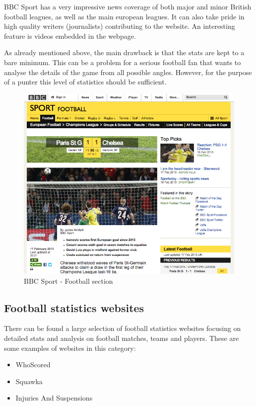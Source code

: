 BBC Sport has a very impressive news coverage of both major and minor British football leagues, as well as the main european leagues. It can also take pride in high quality writers (journalists) contributing to the website. An interesting feature is videos embedded in the webpage.

As already mentioned above, the main drawback is that the stats are kept to a bare minimum. This can be a problem for a serious football fan that wants to analyse the details of the game from all possible angles. However, for the purpose of a punter this level of statistics should be sufficient.
	
\begin{figure}[H]
	\begin{center}
		\includegraphics[width=.80\linewidth,natwidth=610,natheight=642]{req/images/bbcsport.png}
		\caption{BBC Sport - Football section} \label{fig:using:bbcsport}
	\end{center}
\end{figure}
		
\subsection{Football statistics websites}
\label{subsec:footballstatswebsites_req}
There can be found a large selection of football statistics websites focusing on detailed stats and analysis on football matches, teams and players. These are some examples of websites in this category:
			
\begin{itemize}
	\item WhoScored \citep{source:whoscored}  
	\item Squawka  \citep{source:squawka}
	\item Injuries And Suspensions \citep{source:injuriesandsuspensions}
\end{itemize}

